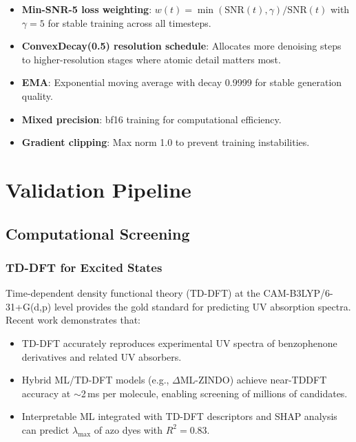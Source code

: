 \documentclass[11pt,a4paper]{article}
\begin{document}
\begin{itemize}[leftmargin=2em]
  \item \textbf{Min-SNR-5 loss weighting}: $w(t) =
    \min(\text{SNR}(t), \gamma) / \text{SNR}(t)$ with $\gamma=5$ for stable
    training across all timesteps.
  \item \textbf{ConvexDecay(0.5) resolution schedule}: Allocates more
    denoising steps to higher-resolution stages where atomic detail matters
    most.
  \item \textbf{EMA}: Exponential moving average with decay 0.9999 for stable
    generation quality.
  \item \textbf{Mixed precision}: bf16 training for computational efficiency.
  \item \textbf{Gradient clipping}: Max norm 1.0 to prevent training
    instabilities.
\end{itemize}

\section{Validation Pipeline}

\subsection{Computational Screening}

\subsubsection{TD-DFT for Excited States}

Time-dependent density functional theory (TD-DFT) at the
CAM-B3LYP/6-31+G(d,p) level provides the gold standard for predicting UV
absorption spectra. Recent work demonstrates that:

\begin{itemize}[leftmargin=2em]
  \item TD-DFT accurately reproduces experimental UV spectra of
    benzophenone derivatives and related UV absorbers.
  \item Hybrid ML/TD-DFT models (e.g., $\Delta$ML-ZINDO) achieve
    near-TDDFT accuracy at $\sim$2\,ms per molecule, enabling screening of
    millions of candidates.
  \item Interpretable ML integrated with TD-DFT descriptors and SHAP
    analysis can predict $\lambda_\text{max}$ of azo dyes with $R^2 = 0.83$.
\end{itemize}
\end{document}
